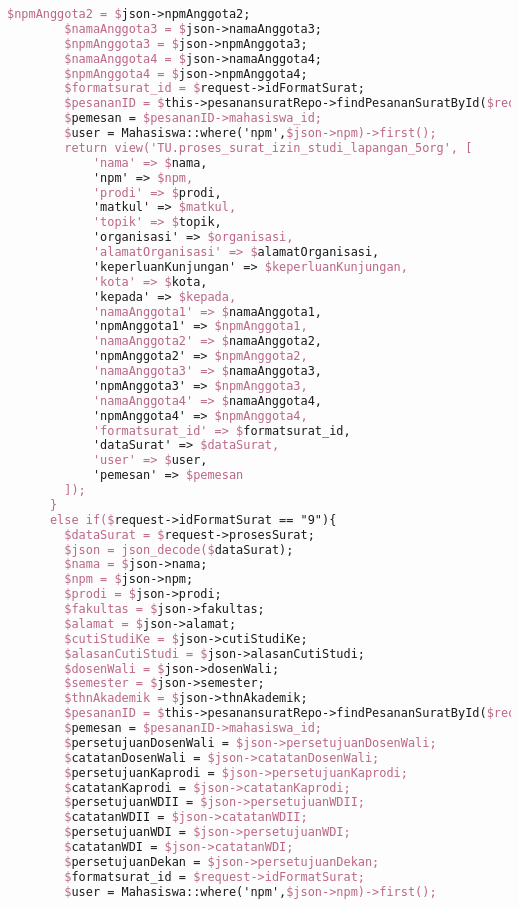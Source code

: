 \begin{lstlisting}[language=tex,basicstyle=\tiny,caption=PesanansuratController.php]
        $npmAnggota2 = $json->npmAnggota2;
        $namaAnggota3 = $json->namaAnggota3;
        $npmAnggota3 = $json->npmAnggota3;
        $namaAnggota4 = $json->namaAnggota4;
        $npmAnggota4 = $json->npmAnggota4;
        $formatsurat_id = $request->idFormatSurat;
        $pesananID = $this->pesanansuratRepo->findPesananSuratById($request->id);
        $pemesan = $pesananID->mahasiswa_id;
        $user = Mahasiswa::where('npm',$json->npm)->first();
        return view('TU.proses_surat_izin_studi_lapangan_5org', [
            'nama' => $nama,
            'npm' => $npm,
            'prodi' => $prodi,
            'matkul' => $matkul,
            'topik' => $topik,
            'organisasi' => $organisasi,
            'alamatOrganisasi' => $alamatOrganisasi,
            'keperluanKunjungan' => $keperluanKunjungan,
            'kota' => $kota,
            'kepada' => $kepada,
            'namaAnggota1' => $namaAnggota1,
            'npmAnggota1' => $npmAnggota1,
            'namaAnggota2' => $namaAnggota2,
            'npmAnggota2' => $npmAnggota2,
            'namaAnggota3' => $namaAnggota3,
            'npmAnggota3' => $npmAnggota3,
            'namaAnggota4' => $namaAnggota4,
            'npmAnggota4' => $npmAnggota4,
            'formatsurat_id' => $formatsurat_id,
            'dataSurat' => $dataSurat,
            'user' => $user,
            'pemesan' => $pemesan
        ]);
      }
      else if($request->idFormatSurat == "9"){
        $dataSurat = $request->prosesSurat;
        $json = json_decode($dataSurat);
        $nama = $json->nama;
        $npm = $json->npm;
        $prodi = $json->prodi;
        $fakultas = $json->fakultas;
        $alamat = $json->alamat;
        $cutiStudiKe = $json->cutiStudiKe;
        $alasanCutiStudi = $json->alasanCutiStudi;
        $dosenWali = $json->dosenWali;
        $semester = $json->semester;
        $thnAkademik = $json->thnAkademik;
        $pesananID = $this->pesanansuratRepo->findPesananSuratById($request->id);
        $pemesan = $pesananID->mahasiswa_id;
        $persetujuanDosenWali = $json->persetujuanDosenWali;
        $catatanDosenWali = $json->catatanDosenWali;
        $persetujuanKaprodi = $json->persetujuanKaprodi;
        $catatanKaprodi = $json->catatanKaprodi;
        $persetujuanWDII = $json->persetujuanWDII;
        $catatanWDII = $json->catatanWDII;
        $persetujuanWDI = $json->persetujuanWDI;
        $catatanWDI = $json->catatanWDI;
        $persetujuanDekan = $json->persetujuanDekan;
        $formatsurat_id = $request->idFormatSurat;
        $user = Mahasiswa::where('npm',$json->npm)->first();

\end{lstlisting}

